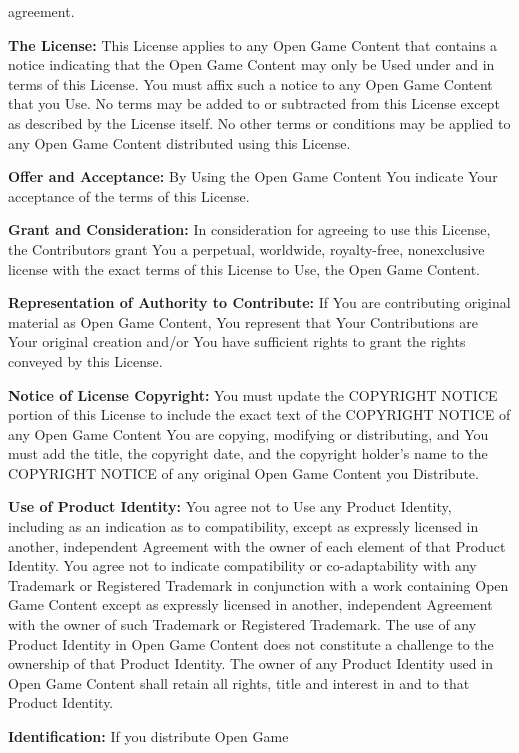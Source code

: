 \documentclass[letterpaper, 12pt, twocolumn]{article}
\begin{document}
\begin{footnotesize}
{agreement.
\item \textbf{The License:} This License applies to any Open 
Game Content that contains a notice indicating that 
the Open Game Content may only be Used under and 
in terms of this License. You must affix such a notice 
to any Open Game Content that you Use. No terms 
may be added to or subtracted from this License 
except as described by the License itself. No other 
terms or conditions may be applied to any Open 
Game Content distributed using this License.
\item \textbf{Offer and Acceptance:} By Using the Open Game 
Content You indicate Your acceptance of the terms of 
this License.
\item \textbf{Grant and Consideration:} In consideration for 
agreeing to use this License, the Contributors grant 
You a perpetual, worldwide, royalty-free, nonexclusive license with the exact terms of this License 
to Use, the Open Game Content.
\item \textbf{Representation of Authority to Contribute:} If You 
are contributing original material as Open Game 
Content, You represent that Your Contributions are 
Your original creation and/or You have sufficient 
rights to grant the rights conveyed by this License.
\item \textbf{Notice of License Copyright:} You must update the 
COPYRIGHT NOTICE portion of this License to 
include the exact text of the COPYRIGHT NOTICE of 
any Open Game Content You are copying, modifying 
or distributing, and You must add the title, the 
copyright date, and the copyright holder's name to 
the COPYRIGHT NOTICE of any original Open Game 
Content you Distribute.
\item \textbf{Use of Product Identity:} You agree not to Use any 
Product Identity, including as an indication as to 
compatibility, except as expressly licensed in 
another, independent Agreement with the owner of 
each element of that Product Identity. You agree not 
to indicate compatibility or co-adaptability with any 
Trademark or Registered Trademark in conjunction 
with a work containing Open Game Content except 
as expressly licensed in another, independent 
Agreement with the owner of such Trademark or 
Registered Trademark. The use of any Product 
Identity in Open Game Content does not constitute a 
challenge to the ownership of that Product Identity. 
The owner of any Product Identity used in Open 
Game Content shall retain all rights, title and interest 
in and to that Product Identity.
\item \textbf{Identification:} If you distribute Open Game 
}
\end{footnotesize}
\end{document}
